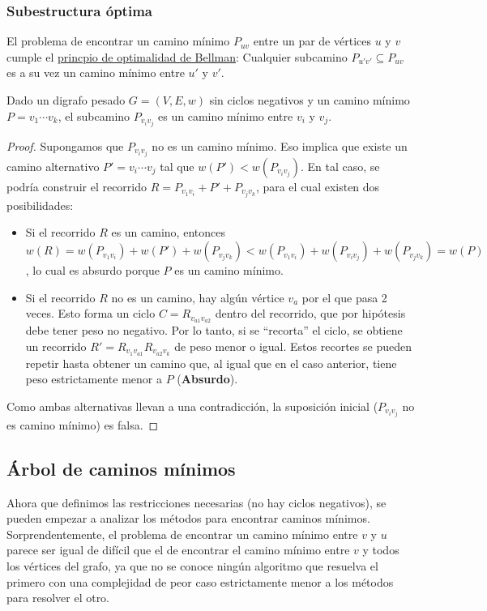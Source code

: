 \subsubsection{Subestructura óptima}

El problema de encontrar un camino mínimo $P_{uv}$ entre un par de vértices $u$ y $v$ cumple el \hyperref[optimalidad-bellman]{princpio de optimalidad de Bellman}: Cualquier subcamino $P_{u'v'} \subseteq P_{uv}$ es a su vez un camino mínimo entre $u'$ y $v'$.
\begin{theorem*}
    Dado un digrafo pesado $G = (V, E, w)$ sin ciclos negativos y un camino mínimo $P = v_1 \cdots v_k$, el subcamino $P_{v_i v_j}$ es un camino mínimo entre $v_i$ y $v_j$.
\end{theorem*}
\begin{proof}
    Supongamos que $P_{v_i v_j}$ no es un camino mínimo. Eso implica que existe un camino alternativo $P' = v_i \cdots v_j$ tal que $w(P') < w(P_{v_i v_j})$. En tal caso, se podría construir el recorrido $R = P_{v_1 v_i} + P' + P_{v_j v_k}$, para el cual existen dos posibilidades:
    \begin{itemize}
        \item Si el recorrido $R$ es un camino, entonces $w(R) = w(P_{v_1 v_i}) + w(P') + w(P_{v_j v_k}) < w(P_{v_1 v_i}) + w(P_{v_i v_j}) + w(P_{v_j v_k}) = w(P)$, lo cual es absurdo porque $P$ es un camino mínimo.
        \item Si el recorrido $R$ no es un camino, hay algún vértice $v_a$ por el que pasa 2 veces. Esto forma un ciclo $C = R_{v_{a1} v_{a2}}$ dentro del recorrido, que por hipótesis debe tener peso no negativo. Por lo tanto, si se ``recorta'' el ciclo, se obtiene un recorrido $R' = R_{v_1 v_{a1}} R_{v_{a2} v_k}$ de peso menor o igual. Estos recortes se pueden repetir hasta obtener un camino que, al igual que en el caso anterior, tiene peso estrictamente menor a $P$ (\textbf{Absurdo}).
    \end{itemize}

    Como ambas alternativas llevan a una contradicción, la suposición inicial ($P_{v_i v_j}$ no es camino mínimo) es falsa.
\end{proof}

\subsection{Árbol de caminos mínimos}

Ahora que definimos las restricciones necesarias (no hay ciclos negativos), se pueden empezar a analizar los métodos para encontrar caminos mínimos. Sorprendentemente, el problema de encontrar un camino mínimo entre $v$ y $u$ parece ser igual de difícil que el de encontrar el camino mínimo entre $v$ y todos los vértices del grafo, ya que no se conoce ningún algoritmo que resuelva el primero con una complejidad  de peor caso estrictamente menor a los métodos para resolver el otro.


